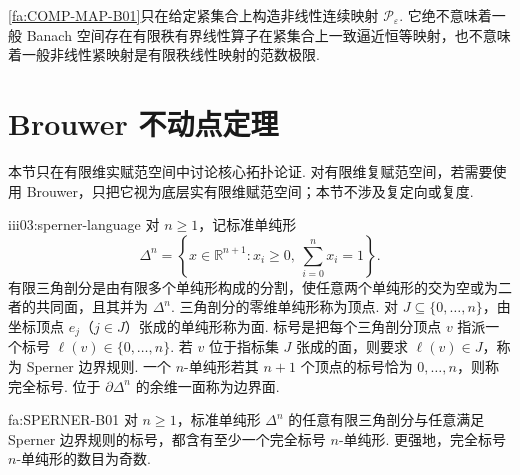 \begin{FAWarning}[逼近性质的边界]
\autoref{fa:COMP-MAP-B01}只在给定紧集合上构造非线性连续映射 \(\displaystyle \mathcal P_{\varepsilon}\). 它绝不意味着一般 Banach 空间存在有限秩有界线性算子在紧集合上一致逼近恒等映射，也不意味着一般非线性紧映射是有限秩线性映射的范数极限.
\end{FAWarning}

\section{Brouwer 不动点定理}\label{sec:iii03-brouwer}

本节只在有限维实赋范空间中讨论核心拓扑论证. 对有限维复赋范空间，若需要使用 Brouwer，只把它视为底层实有限维赋范空间；本节不涉及复定向或复度.

\begin{FADefinition}{iii03:sperner-language}
对 \(\displaystyle n\geqslant1\)，记标准单纯形
\[
\Delta^n
=
\left\{x\in\mathbb R^{n+1}:x_i\geqslant0,\ \sum_{i=0}^{n}x_i=1\right\}.
\]
有限三角剖分是由有限多个单纯形构成的分割，使任意两个单纯形的交为空或为二者的共同面，且其并为 \(\displaystyle \Delta^n\). 三角剖分的零维单纯形称为顶点. 对 \(\displaystyle J\subseteq\{0,\dots,n\}\)，由坐标顶点 \(\displaystyle e_j\)（\(\displaystyle j\in J\)）张成的单纯形称为面. 标号是把每个三角剖分顶点 \(\displaystyle v\) 指派一个标号 \(\displaystyle \ell(v)\in\{0,\dots,n\}\). 若 \(\displaystyle v\) 位于指标集 \(\displaystyle J\) 张成的面，则要求 \(\displaystyle \ell(v)\in J\)，称为 Sperner 边界规则. 一个 \(\displaystyle n\)-单纯形若其 \(\displaystyle n+1\) 个顶点的标号恰为 \(\displaystyle0,\dots,n\)，则称完全标号. 位于 \(\displaystyle \partial\Delta^n\) 的余维一面称为边界面.
\end{FADefinition}

\begin{FATheorem}[B][Sperner 引理]{fa:SPERNER-B01}
对 \(\displaystyle n\geqslant1\)，标准单纯形 \(\displaystyle \Delta^n\) 的任意有限三角剖分与任意满足 Sperner 边界规则的标号，都含有至少一个完全标号 \(\displaystyle n\)-单纯形. 更强地，完全标号 \(\displaystyle n\)-单纯形的数目为奇数.
\end{FATheorem}

